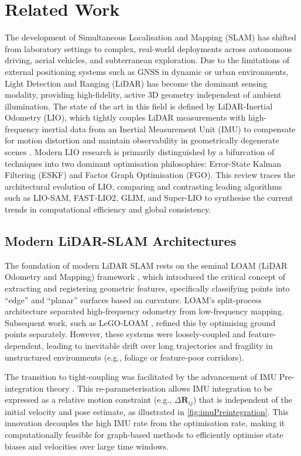 \section{Related Work}
\label{sec:slam-related-work}
The development of Simultaneous Localisation and Mapping (SLAM) has shifted from laboratory settings to complex, real-world deployments across autonomous driving, aerial vehicles, and subterranean exploration. Due to the limitations of external positioning systems such as GNSS in dynamic or urban environments, Light Detection and Ranging (LiDAR) has become the dominant sensing modality, providing high-fidelity, active 3D geometry independent of ambient illumination. The state of the art in this field is defined by LiDAR-Inertial Odometry (LIO), which tightly couples LiDAR measurements with high-frequency inertial data from an Inertial Measurement Unit (IMU) to compensate for motion distortion and maintain observability in geometrically degenerate scenes \cite{koideGLIM3DRangeInertial2024}. Modern LIO research is primarily distinguished by a bifurcation of techniques into two dominant optimisation philosophies: Error-State Kalman Filtering (ESKF) and Factor Graph Optimisation (FGO). This review traces the architectural evolution of LIO, comparing and contrasting leading algorithms such as LIO-SAM, FAST-LIO2, GLIM, and Super-LIO to synthesise the current trends in computational efficiency and global consistency.

\subsection{Modern LiDAR-SLAM Architectures}
\label{subsec:lidar-slam-architectures}
The foundation of modern LiDAR SLAM rests on the seminal LOAM (LiDAR Odometry and Mapping) framework \cite{zhangLOAMLidarOdometry2014}, which introduced the critical concept of extracting and registering geometric features, specifically classifying points into ``edge'' and ``planar'' surfaces based on curvature. LOAM's split-process architecture separated high-frequency odometry from low-frequency mapping. Subsequent work, such as LeGO-LOAM \cite{shanLeGOLOAMLightweightGroundOptimized2018}, refined this by optimising ground points separately. However, these systems were loosely-coupled and feature-dependent, leading to inevitable drift over long trajectories and fragility in unstructured environments (e.g., foliage or feature-poor corridors).

The transition to tight-coupling was facilitated by the advancement of IMU Pre-integration theory \cite{forsterOnManifoldPreintegrationRealTime2017}. This re-parameterisation allows IMU integration to be expressed as a relative motion constraint (e.g., $\Delta \mathbf{R}_{ij}$) that is independent of the initial velocity and pose estimate, as illustrated in \cref{fig:imuPreintegration}. This innovation decouples the high IMU rate from the optimisation rate, making it computationally feasible for graph-based methods to efficiently optimise state biases and velocities over large time windows.

